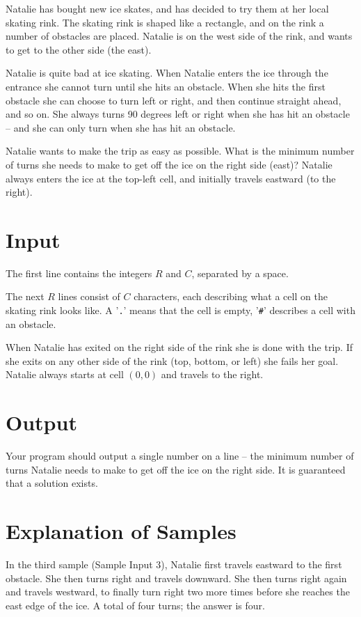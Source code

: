 Natalie has bought new ice skates, and has decided to try them at her
local skating rink. The skating rink is shaped like a rectangle, and on the rink
a number of obstacles are placed. Natalie is on the west side of the rink,
and wants to get to the other side (the east).

Natalie is quite bad at ice skating. When Natalie enters the ice
through the entrance she cannot turn until she hits an obstacle. When she
hits the first obstacle she can choose to turn left or right,
and then continue straight ahead, and so on. She always turns
90 degrees left or right when she has hit an obstacle -- and she can only turn
when she has hit an obstacle.

Natalie wants to make the trip as easy as possible. What is the minimum number of turns
she needs to make to get off the ice on the right side (east)?
Natalie always enters the ice at the top-left cell, and initially
travels eastward (to the right).

\section*{Input}
The first line contains the integers $R$ and $C$,
separated by a space.

The next $R$ lines consist of $C$ characters, each describing what a cell
on the skating rink looks like. A '\texttt{.}' means that the cell is empty,
'\texttt{\#}' describes a cell with an obstacle.

When Natalie has exited on the right side of the rink she is done with the trip. If she exits
on any other side of the rink (top, bottom, or left) she fails her
goal. Natalie always starts at cell $(0,0)$ and travels to the right.

\section*{Output}
Your program should output a single number on a line -- the minimum number of turns Natalie
needs to make to get off the ice on the right side. It is guaranteed that
a solution exists.

\section*{Explanation of Samples}
In the third sample (Sample Input 3), Natalie first travels eastward to the first obstacle. She
then turns right and travels downward. She then turns right again and travels westward, to finally
turn right two more times before she reaches the east edge of the ice. A total of four turns; the answer is four.

